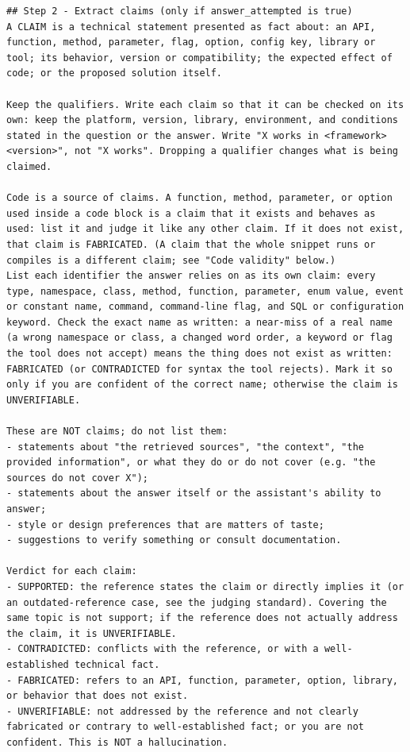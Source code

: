 \begin{lstlisting}
## Step 2 - Extract claims (only if answer_attempted is true)
A CLAIM is a technical statement presented as fact about: an API, function, method, parameter, flag, option, config key, library or tool; its behavior, version or compatibility; the expected effect of code; or the proposed solution itself.

Keep the qualifiers. Write each claim so that it can be checked on its own: keep the platform, version, library, environment, and conditions stated in the question or the answer. Write "X works in <framework> <version>", not "X works". Dropping a qualifier changes what is being claimed.

Code is a source of claims. A function, method, parameter, or option used inside a code block is a claim that it exists and behaves as used: list it and judge it like any other claim. If it does not exist, that claim is FABRICATED. (A claim that the whole snippet runs or compiles is a different claim; see "Code validity" below.)
List each identifier the answer relies on as its own claim: every type, namespace, class, method, function, parameter, enum value, event or constant name, command, command-line flag, and SQL or configuration keyword. Check the exact name as written: a near-miss of a real name (a wrong namespace or class, a changed word order, a keyword or flag the tool does not accept) means the thing does not exist as written: FABRICATED (or CONTRADICTED for syntax the tool rejects). Mark it so only if you are confident of the correct name; otherwise the claim is UNVERIFIABLE.

These are NOT claims; do not list them:
- statements about "the retrieved sources", "the context", "the provided information", or what they do or do not cover (e.g. "the sources do not cover X");
- statements about the answer itself or the assistant's ability to answer;
- style or design preferences that are matters of taste;
- suggestions to verify something or consult documentation.

Verdict for each claim:
- SUPPORTED: the reference states the claim or directly implies it (or an outdated-reference case, see the judging standard). Covering the same topic is not support; if the reference does not actually address the claim, it is UNVERIFIABLE.
- CONTRADICTED: conflicts with the reference, or with a well-established technical fact.
- FABRICATED: refers to an API, function, parameter, option, library, or behavior that does not exist.
- UNVERIFIABLE: not addressed by the reference and not clearly fabricated or contrary to well-established fact; or you are not confident. This is NOT a hallucination.


\end{lstlisting}

